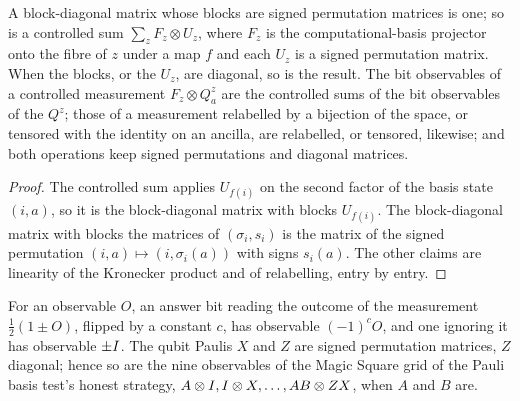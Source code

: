 \begin{lemma}
\label{lem:controlled-signed-perm}
\leanok
A block-diagonal matrix whose blocks are signed permutation matrices is one; so is a
controlled sum $\sum_z F_z \otimes U_z$, where $F_z$ is the computational-basis projector onto
the fibre of $z$ under a map $f$ and each $U_z$ is a signed permutation matrix. When the
blocks, or the $U_z$, are diagonal, so is the result. The bit observables of a controlled
measurement $F_z \otimes Q^z_a$ are the controlled sums of the bit observables of the $Q^z$;
those of a measurement relabelled by a bijection of the space, or tensored with the identity on
an ancilla, are relabelled, or tensored, likewise; and both operations keep signed
permutations and diagonal matrices.
\end{lemma}

\begin{proof}
\leanok
The controlled sum applies $U_{f(i)}$ on the second factor of the basis state $(i, a)$, so it is
the block-diagonal matrix with blocks $U_{f(i)}$. The block-diagonal matrix with blocks the
matrices of $(\sigma_i, s_i)$ is the matrix of the signed permutation $(i, a) \mapsto (i,
\sigma_i(a))$ with signs $s_i(a)$. The other claims are linearity of the Kronecker product and
of relabelling, entry by entry.
\end{proof}

\begin{lemma}
\label{lem:binary-signed-perm}
\leanok
For an observable $O$, an answer bit reading the outcome of the measurement
$\frac12(1 \pm O)$, flipped by a constant $c$, has observable $(-1)^c O$, and one ignoring it
has observable $\pm I$. The qubit Paulis $X$ and $Z$ are signed permutation matrices, $Z$
diagonal; hence so are the nine observables of the Magic Square grid of the Pauli basis test's
honest strategy, $A \otimes I, I \otimes X, \ldots, AB \otimes ZX$, when $A$ and $B$ are.
\end{lemma}

